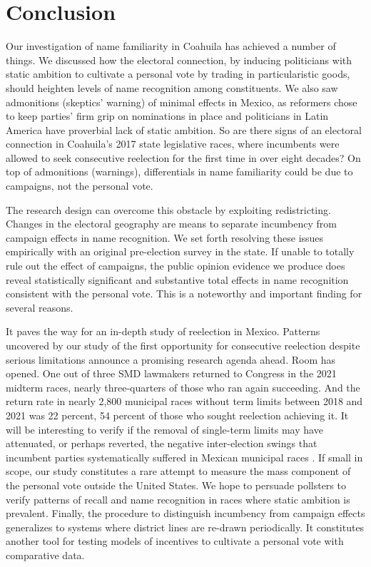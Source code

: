 \documentclass[letter,12pt]{article}
\begin{document}
\section{Conclusion}

Our investigation of name familiarity in Coahuila has achieved a number of things. We discussed how the electoral connection, by inducing politicians with static ambition to cultivate a personal vote by trading in particularistic goods, should heighten levels of name recognition among constituents. We also saw admonitions (skeptics' warning) of minimal effects in Mexico, as reformers chose to keep parties' firm grip on nominations in place and politicians in Latin America have proverbial lack of static ambition. So are there signs of an electoral connection in Coahuila's 2017 state legislative races, where incumbents were allowed to seek consecutive reelection for the first time in over eight decades? On top of admonitions (warnings), differentials in name familiarity could be due to campaigns, not the personal vote. 

The research design can overcome this obstacle by exploiting redistricting. Changes in the electoral geography are means to separate incumbency from campaign effects in name recognition. We set forth resolving these issues empirically with an original pre-election survey in the state. If unable to totally rule out the effect of campaigns, the public opinion evidence we produce does reveal statistically significant and substantive total effects in name recognition consistent with the personal vote. This is a noteworthy and important finding for several reasons. 

It paves the way for an in-depth study of reelection in Mexico. Patterns uncovered by our study of the first opportunity for consecutive reelection despite serious limitations announce a promising research agenda ahead. Room has opened. One out of three SMD lawmakers returned to Congress in the 2021 midterm races, nearly three-quarters of those who ran again succeeding. And the return rate in nearly 2,800 municipal races without term limits between 2018 and 2021 was 22 percent, 54 percent of those who sought reelection achieving it. It will be interesting to verify if the removal of single-term limits may have attenuated, or perhaps reverted, the negative inter-election swings that incumbent parties systematically suffered in Mexican municipal races \citep{lucardi.rosas.Incumbency.2016}. If small in scope, our study constitutes a rare attempt to measure the mass component of the personal vote outside the United States. We hope to persuade pollsters to verify patterns of recall and name recognition in races where static ambition is prevalent. Finally, the procedure to distinguish incumbency from campaign effects generalizes to systems where district lines are re-drawn periodically. It constitutes another tool for testing models of incentives to cultivate a personal vote with comparative data. 

\singlespacing



\end{document}
